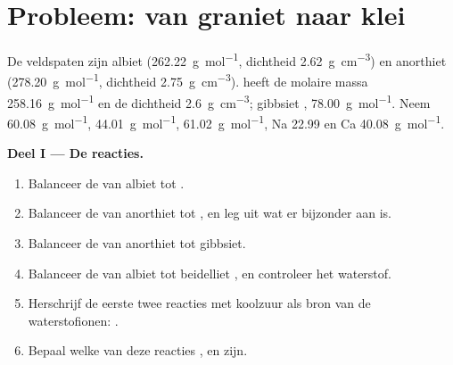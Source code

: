 \section{Probleem: van graniet naar klei}

\begin{problem}
\label{pb:b1:weathering-clays:1}
De veldspaten zijn albiet  (\qty{262.22}{g.mol^{-1}}, dichtheid \qty{2.62}{g.cm^{-3}}) en anorthiet  (\qty{278.20}{g.mol^{-1}}, dichtheid \qty{2.75}{g.cm^{-3}}).   heeft de molaire massa \qty{258.16}{g.mol^{-1}} en de dichtheid \qty{2.6}{g.cm^{-3}}; gibbsiet , \qty{78.00}{g.mol^{-1}}. Neem  \qty{60.08}{g.mol^{-1}},  \qty{44.01}{g.mol^{-1}},  \qty{61.02}{g.mol^{-1}}, Na \num{22.99} en Ca \qty{40.08}{g.mol^{-1}}.

\medskip
\noindent\textbf{Deel I --- De reacties.}
\begin{enumerate}
  \item Balanceer de  van albiet tot .
  \item Balanceer de  van anorthiet tot , en leg uit wat er bijzonder aan is.
  \item Balanceer de  van anorthiet tot gibbsiet.
  \item Balanceer de  van albiet tot beidelliet , en controleer het waterstof.
  \item Herschrijf de eerste twee reacties met koolzuur als bron van de waterstofionen: .
  \item Bepaal welke van deze reacties ,  en  zijn.
\end{enumerate}


\end{problem}
